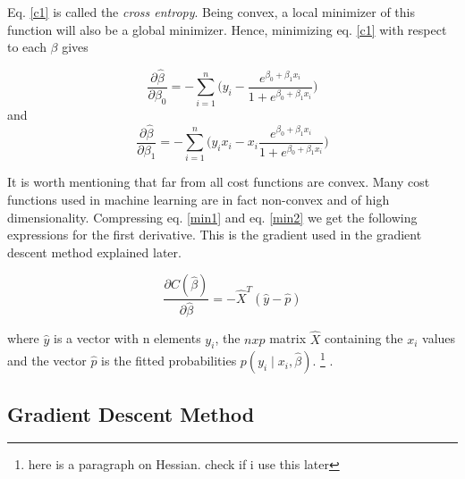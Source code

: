 \documentclass[a4paper,11pt,twocolumn]{article}
\begin{document}
Eq. \eqref{c1} is called the \textit{cross entropy}. Being convex, a local minimizer of this function will also be a global minimizer. Hence, minimizing eq. \eqref{c1} with respect to each $\beta$ gives 


\begin{equation}
\frac{\partial\hat{\beta}}{\partial\beta_0}=
-\sum\limits_{i=1}^n\big(y_i-\frac{e^{\beta_0+\beta_1x_i}}{1+e^{\beta_0+\beta_1x_i}}\big)
\label{min1}
\end{equation}
and 
\begin{equation}
\frac{\partial\hat{\beta}}{\partial\beta_1}=
-\sum\limits_{i=1}^n\big(y_ix_i-x_i\frac{e^{\beta_0+\beta_1x_i}}{1+e^{\beta_0+\beta_1x_i}}\big)
\label{min2}
\end{equation}

It is worth mentioning that far from all cost functions are convex. Many cost functions used in machine learning are in fact non-convex and of high dimensionality. Compressing eq. \eqref{min1} and eq. \eqref{min2} we get the following expressions for the first derivative. This is the gradient used in the gradient descent method explained later.

\begin{equation}
\frac{\partial C(\hat{\beta})}{\partial\hat{\beta}}=-\hat{X}^T(\hat{y}-\hat{p})
\label{compcost1}
\end{equation}


where $\hat{y}$ is a vector with n elements $y_i$, the $n x p$ matrix $\hat{X}$ containing the $x_i$ values and the vector $\hat{p}$ is the fitted probabilities $p(y_i\mid x_i,\hat{\beta})$.
\footnote{here is a paragraph on Hessian. check if i use this later}
\cite{slides}. 

\subsection{Gradient Descent Method}
\end{document}

